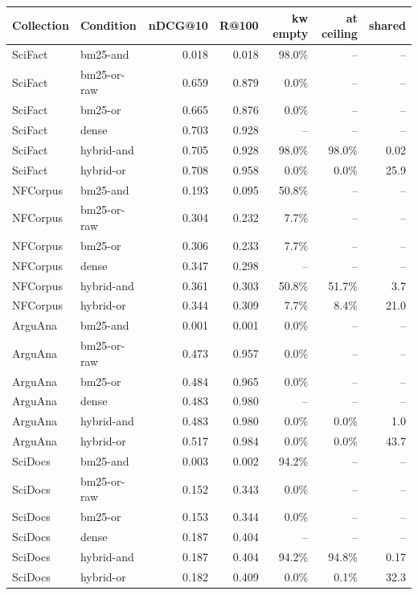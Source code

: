 \documentclass[11pt]{article}
\begin{document}
\begin{table}[p]
\centering
\small
\begin{tabular}{llrrrrr}
\toprule
Collection & Condition & nDCG@10 & R@100 & kw empty & at ceiling & shared \\
\midrule
SciFact & bm25-and & 0.018 & 0.018 & 98.0\% & -- & -- \\
SciFact & bm25-or-raw & 0.659 & 0.879 & 0.0\% & -- & -- \\
SciFact & bm25-or & 0.665 & 0.876 & 0.0\% & -- & -- \\
SciFact & dense & 0.703 & 0.928 & -- & -- & -- \\
SciFact & hybrid-and & 0.705 & 0.928 & 98.0\% & 98.0\% & 0.02 \\
SciFact & hybrid-or & 0.708 & 0.958 & 0.0\% & 0.0\% & 25.9 \\
\midrule
NFCorpus & bm25-and & 0.193 & 0.095 & 50.8\% & -- & -- \\
NFCorpus & bm25-or-raw & 0.304 & 0.232 & 7.7\% & -- & -- \\
NFCorpus & bm25-or & 0.306 & 0.233 & 7.7\% & -- & -- \\
NFCorpus & dense & 0.347 & 0.298 & -- & -- & -- \\
NFCorpus & hybrid-and & 0.361 & 0.303 & 50.8\% & 51.7\% & 3.7 \\
NFCorpus & hybrid-or & 0.344 & 0.309 & 7.7\% & 8.4\% & 21.0 \\
\midrule
ArguAna & bm25-and & 0.001 & 0.001 & 0.0\% & -- & -- \\
ArguAna & bm25-or-raw & 0.473 & 0.957 & 0.0\% & -- & -- \\
ArguAna & bm25-or & 0.484 & 0.965 & 0.0\% & -- & -- \\
ArguAna & dense & 0.483 & 0.980 & -- & -- & -- \\
ArguAna & hybrid-and & 0.483 & 0.980 & 0.0\% & 0.0\% & 1.0 \\
ArguAna & hybrid-or & 0.517 & 0.984 & 0.0\% & 0.0\% & 43.7 \\
\midrule
SciDocs & bm25-and & 0.003 & 0.002 & 94.2\% & -- & -- \\
SciDocs & bm25-or-raw & 0.152 & 0.343 & 0.0\% & -- & -- \\
SciDocs & bm25-or & 0.153 & 0.344 & 0.0\% & -- & -- \\
SciDocs & dense & 0.187 & 0.404 & -- & -- & -- \\
SciDocs & hybrid-and & 0.187 & 0.404 & 94.2\% & 94.8\% & 0.17 \\
SciDocs & hybrid-or & 0.182 & 0.409 & 0.0\% & 0.1\% & 32.3 \\

\end{tabular}
\end{table}
\end{document}
